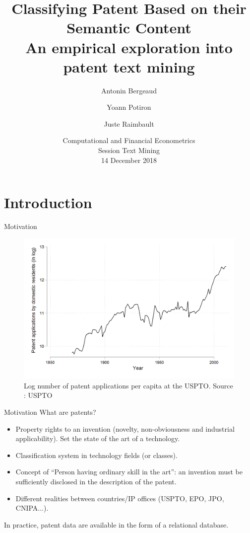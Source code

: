 \documentclass{beamer}
\title[Patent Mining]{Classifying Patent Based on their Semantic Content \\ An empirical exploration into patent text mining}
\author[Bergeaud, Potiron, Raimbault]{Antonin Bergeaud \and Yoann Potiron \and Juste Raimbault}
\institute[]{Banque de France, Keio University and ISC-PIF}
\date[14/12/2018]{Computational and Financial Econometrics\\
Session Text Mining\\
14 December 2018}
\begin{document}
\begin{frame}
  \titlepage
\end{frame}

\section{Introduction}

%    
%
%
%    
\begin{frame}{Motivation}
    \begin{figure}
        \includegraphics[width=0.8\linewidth]{figures/patent_usa.png}
        \caption{Log number of patent applications per capita at the USPTO. Source : USPTO}
    \end{figure}
\end{frame}
\begin{frame}{Motivation}
What are patents?
\begin{itemize}
    \item Property rights to an invention (novelty, non-obviousness and industrial applicability). Set the state of the art of a technology.
    \item Classification system in technology fields (or classes).
    \item Concept of ``Person having ordinary skill in the art'': an invention must be sufficiently disclosed in the description of the patent.
    \item Different realities between countries/IP offices (USPTO, EPO, JPO, CNIPA...).
\end{itemize}

In practice, patent data are available in the form of a relational database.
\end{frame}
\end{document}
